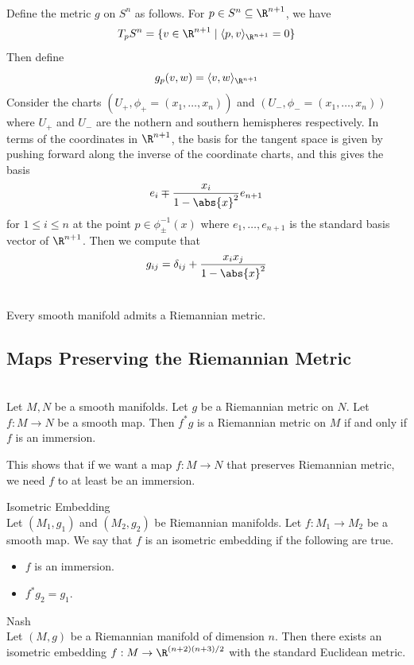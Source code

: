\documentclass[a4paper]{article}
\begin{document}
\begin{eg}{}{}\\
Define the metric $g$ on $S^n$ as follows. For $p\in S^n\subseteq\R^{n+1}$, we have $$T_pS^n=\{v\in\R^{n+1}\;|\;\langle p,v\rangle_{\R^{n+1}}=0\}$$ Then define $$g_p(v,w)=\langle v,w\rangle_{\R^{n+1}}$$ Consider the charts $(U_+,\phi_+=(x_1,\dots,x_n))$ and $(U_-,\phi_-=(x_1,\dots,x_n))$ where $U_+$ and $U_-$ are the nothern and southern hemispheres respectively. In terms of the coordinates in $\R^{n+1}$, the basis for the tangent space is given by pushing forward along the inverse of the coordinate charts, and this gives the basis $$e_i\mp\frac{x_i}{1-\abs{x}^2}e_{n+1}$$ for $1\leq i\leq n$ at the point $p\in\phi_{\pm}^{-1}(x)$ where $e_1,\dots,e_{n+1}$ is the standard basis vector of $\R^{n+1}$. Then we compute that $$g_{ij}=\delta_{ij}+\frac{x_ix_j}{1-\abs{x}^2}$$
\end{eg}

\begin{prp}{}{}\\
Every smooth manifold admits a Riemannian metric. 
\end{prp}

\subsection{Maps Preserving the Riemannian Metric}
\begin{prp}{}{}\\
Let $M,N$ be a smooth manifolds. Let $g$ be a Riemannian metric on $N$. Let $f:M\to N$ be a smooth map. Then $f^\ast g$ is a Riemannian metric on $M$ if and only if $f$ is an immersion. 
\end{prp}

This shows that if we want a map $f:M\to N$ that preserves Riemannian metric, we need $f$ to at least be an immersion. 

\begin{defn}{Isometric Embedding}{}\\
Let $(M_1,g_1)$ and $(M_2,g_2)$ be Riemannian manifolds. Let $f:M_1\to M_2$ be a smooth map. We say that $f$ is an isometric embedding if the following are true. 
\begin{itemize}
\item $f$ is an immersion. 
\item $f^\ast g_2=g_1$. 
\end{itemize}
\end{defn}

\begin{thm}{Nash}{}\\
Let $(M,g)$ be a Riemannian manifold of dimension $n$. Then there exists an isometric embedding $f:M\to\R^{(n+2)(n+3)/2}$ with the standard Euclidean metric. 
\end{thm}
\end{document}

